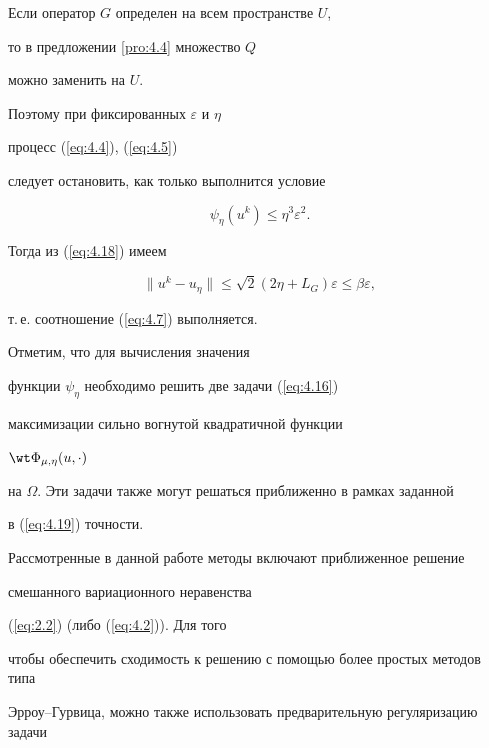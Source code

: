 \begin{note}


Если оператор $G$ определен на всем пространстве $U$,


то в предложении \ref{pro:4.4} множество $Q$ 


можно заменить на $U$.





Поэтому при фиксированных $\varepsilon$ и $\eta$


процесс (\ref{eq:4.4}), (\ref{eq:4.5})


следует остановить, как только выполнится условие


\begin{equation} \label{eq:4.19} 


\psi_{\eta} (u^{k} ) \leq \eta^{3} \varepsilon^2. 


\end{equation}


Тогда из (\ref{eq:4.18}) имеем


$$


\|u^{k} - u_{\eta} \| \leq \sqrt2 (2\eta+L_{G}) \varepsilon \leq


\beta \varepsilon, 


$$


т.\,е. соотношение (\ref{eq:4.7}) выполняется. 


Отметим, что для вычисления значения 


функции $\psi_{\eta}$ необходимо решить две задачи (\ref{eq:4.16}) 


максимизации сильно вогнутой квадратичной функции


$\wt \Phi_ {\mu , \eta} (u,\cdot )$ 


на $\Omega$. Эти задачи также могут решаться приближенно в рамках заданной 


в (\ref{eq:4.19}) точности.


\end{note}





Рассмотренные в данной работе методы включают приближенное решение 


смешанного вариационного неравенства


(\ref{eq:2.2}) (либо (\ref{eq:4.2})). Для того 


чтобы обеспечить сходимость к решению с помощью более простых методов типа 


Эрроу--Гурвица, можно также использовать предварительную регуляризацию задачи 


